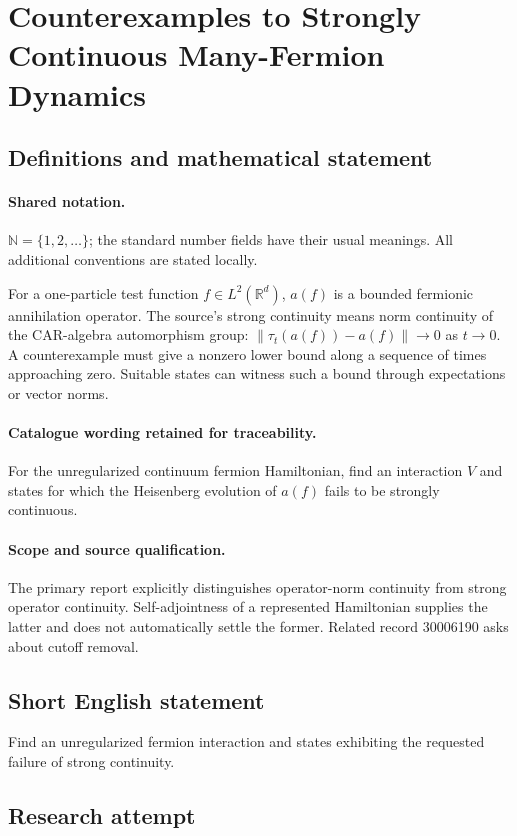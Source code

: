 \documentclass[11pt]{article}
\begin{document}
\section{Counterexamples to Strongly Continuous Many-Fermion Dynamics}\label{statement}

\subsection{Definitions and mathematical statement}

\paragraph{Shared notation.}$\mathbb N=\{1,2,\ldots\}$; the standard number fields have their usual meanings. All additional conventions are stated locally.


For a one-particle test function $f\in L^2(\mathbb R^d)$, $a(f)$ is a bounded fermionic annihilation operator. The source's strong continuity means norm continuity of the CAR-algebra automorphism group: $\|\tau_t(a(f))-a(f)\|\to0$ as $t\to0$. A counterexample must give a nonzero lower bound along a sequence of times approaching zero. Suitable states can witness such a bound through expectations or vector norms.

\paragraph{Catalogue wording retained for traceability.}
For the unregularized continuum fermion Hamiltonian, find an interaction $V$ and states for which the Heisenberg evolution of $a(f)$ fails to be strongly continuous.

\paragraph{Scope and source qualification.}The primary report explicitly distinguishes operator-norm continuity from strong operator continuity. Self-adjointness of a represented Hamiltonian supplies the latter and does not automatically settle the former. Related record 30006190 asks about cutoff removal.
\subsection{Short English statement}
Find an unregularized fermion interaction and states exhibiting the requested failure of strong continuity.
\subsection{Research attempt}
\end{document}
